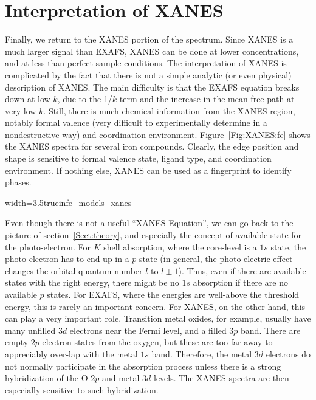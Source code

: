 \section{Interpretation of XANES}

Finally, we return to the XANES portion of the spectrum. Since XANES is a
much larger signal than EXAFS, XANES can be done at lower concentrations,
and at less-than-perfect sample conditions. The interpretation of XANES is
complicated by the fact that there is not a simple analytic (or even
physical) description of XANES. The main difficulty is that the EXAFS
equation breaks down at low-$k$, due to the 1/$k$ term and the increase in
the mean-free-path at very low-$k$. Still, there is much chemical
information from the XANES region, notably formal valence (very difficult
to experimentally determine in a nondestructive way) and coordination
environment. Figure~\ref{Fig:XANES:fe} shows the XANES spectra for several
iron compounds. Clearly, the edge position and shape is sensitive to formal
valence state, ligand type, and coordination environment.  If nothing else,
XANES can be used as a fingerprint to identify phases.

\begin{Nfig}{width=3.5truein}{fe_models_xanes}
  \caption{Fe $K$-edge XANES of Fe metal and several Fe compounds.}
  \label{Fig:XANES:fe}
\end{Nfig}

Even though there is not a useful ``XANES Equation'', we can go back to the
picture of section~\ref{Sect:theory}, and especially the concept of
available state for the photo-electron.  For $K$ shell absorption, where
the core-level is a $1s$ state, the photo-electron has to end up in a $p$
state (in general, the photo-electric effect changes the orbital quantum
number $l$ to $l\pm 1$).  Thus, even if there are available states with the
right energy, there might be no $1s$ absorption if there are no available
$p$ states.  For EXAFS, where the energies are well-above the threshold
energy, this is rarely an important concern.  For XANES, on the other hand,
this can play a very important role.  Transition metal oxides, for example,
usually have many unfilled $3d$ electrons near the Fermi level, and a
filled $3p$ band.  There are empty $2p$ electron states from the oxygen,
but these are too far away to appreciably over-lap with the metal $1s$
band.  Therefore, the metal $3d$ electrons do not normally participate in
the absorption process unless there is a strong hybridization of the O $2p$
and metal $3d$ levels.  The XANES spectra are then especially sensitive to
such hybridization.

